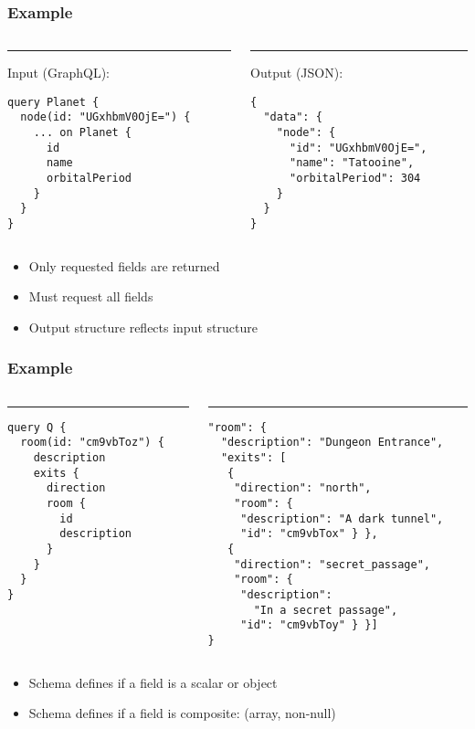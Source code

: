 \documentclass[lualatex]{beamer}
\begin{document}
\begin{frame}[fragile]
  \frametitle{Example}
\begin{columns}[T] %
\begin{column}{.5\textwidth}
\color{black}\rule{\linewidth}{1pt}
Input (GraphQL):
\begin{verbatim}
query Planet {
  node(id: "UGxhbmV0OjE=") {
    ... on Planet {
      id
      name
      orbitalPeriod
    }
  }
}
\end{verbatim}
\end{column}
\hfill
\begin{column}{.5\textwidth}
\color{gray}\rule{\linewidth}{1pt}
Output (JSON):
\begin{verbatim}
{
  "data": {
    "node": {
      "id": "UGxhbmV0OjE=",
      "name": "Tatooine",
      "orbitalPeriod": 304
    }
  }
}
\end{verbatim}
\end{column}%
\end{columns}
\begin{itemize}
\item Only requested fields are returned
\item Must request all fields
\item Output structure reflects input structure
\end{itemize}
\end{frame}

\begin{frame}[fragile]
  \frametitle{Example}
\begin{columns}[T] %
\begin{column}{.5\textwidth}
\color{black}\rule{\linewidth}{1pt}
\begin{verbatim}
query Q {
  room(id: "cm9vbToz") {
    description
    exits {
      direction
      room {
        id
        description
      }
    }
  }
}
\end{verbatim}
\end{column}
\hfill
\begin{column}{.5\textwidth}
\color{gray}\rule{\linewidth}{1pt}
\begin{verbatim}
"room": {
  "description": "Dungeon Entrance",
  "exits": [
   {
    "direction": "north",
    "room": {
     "description": "A dark tunnel",
     "id": "cm9vbTox" } },
   {
    "direction": "secret_passage",
    "room": {
     "description":
       "In a secret passage",
     "id": "cm9vbToy" } }]
}
\end{verbatim}
\end{column}
\end{columns}
\begin{itemize}
\item Schema defines if a field is a scalar or object
\item Schema defines if a field is composite: (array, non-null)
\end{itemize}
\end{frame}
\end{document}

